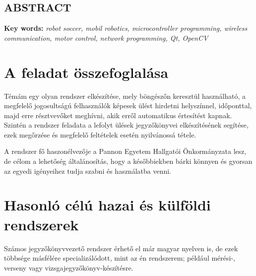 \documentclass[a4paper,12pt,oneside]{report}
\begin{document}
\newpage

\begin{center}
\section*{\textbf{\Large \MakeUppercase{Abstract}}}
\end{center}


\vspace{2cm}

{\bf Key words:} {\it robot soccer, mobil robotics, microcontroller programming,
wireless communication, motor control, network programming, Qt, OpenCV }
\newpage
\listoftodos

\renewcommand{\thefigure}{\arabic{figure}}

\setcounter{tocdepth}{3} %
\thispagestyle{empty}
\thispagestyle{empty}
\tableofcontents
\pagebreak

\setcounter{page}{1} %
\pagestyle{plain}

\section{A feladat összefoglalása}

Témám egy olyan rendszer elkészítése, mely böngészőn keresztül használható, a megfelelő jogosultságú felhasználók képesek ülést hirdetni helyszínnel, időponttal, majd erre résztvevőket meghívni, akik erről automatikus értesítést kapnak. Szintén a rendszer feladata a lefolyt ülések jegyzőkönyvei elkészítésének segítése, ezek megőrzése és megfelelő feltételek esetén nyilvánossá tétele.

A rendszer fő haszonélvezője a Pannon Egyetem Hallgatói Önkormányzata lesz, de célom a lehetőség általánosítás, hogy a későbbiekben bárki könnyen és gyorsan az egyedi igényeihez tudja szabni és használatba venni.

\section{Hasonló célú hazai és külföldi rendszerek}

Számos jegyzőkönyvvezető rendszer érhető el már magyar nyelven is, de ezek többsége másfélére specializálódott, mint az én rendszerem; például mérési-, verseny vagy vizsgajegyzőkönyv-készítésre.
\end{document}
